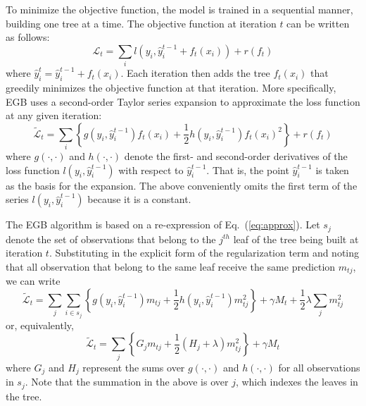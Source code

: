 \documentclass[english]{article}
\begin{document}
To minimize the objective function, the model is trained in a sequential manner, building one
tree at a time. 
The objective function at iteration $t$ can be written as follows:
\begin{equation}
\mathcal{L}_t = \sum_i l(y_i, \hat{y}_i^{t-1} + f_t(x_i)) + r(f_t)
\end{equation}
where $\hat{y}_i^t = \hat{y}_i^{t-1} + f_t(x_i)$.
Each iteration then adds the tree $f_t(x_i)$ that greedily minimizes the objective function at that
iteration.
More specifically, EGB uses a second-order Taylor series expansion to approximate the loss
function at any given iteration:
\begin{equation}
\tilde{\mathcal{L}}_t = \sum_i \left\{g(y_i, \hat{y}_i^{t-1}) f_t(x_i) 
+ \frac{1}{2}h(y_i, \hat{y}_i^{t-1}) f_t(x_i)^2 \right\} + r(f_t)
\label{eq:approx}
\end{equation}
where $g(\cdot, \cdot)$ and $h(\cdot, \cdot)$ denote the first- and second-order derivatives of the 
loss function $l(y_i, \hat{y}_i^{t-1})$ with respect to $\hat{y}_i^{t-1}$.
That is, the point $\hat{y}_i^{t-1}$ is taken as the basis for the expansion.
The above conveniently omits the first term of the series $l(y_i, \hat{y}_i^{t-1})$ because it is a constant.

The EGB algorithm is based on a re-expression of Eq.\ (\ref{eq:approx}).
Let $s_j$ denote the set of observations that belong to the $j^{th}$ leaf of the tree being built at 
iteration $t$.
Substituting in the explicit form of the regularization term and noting that all observation that belong to 
the same leaf receive the same prediction $m_{tj}$, we can write
\begin{equation}
\tilde{\mathcal{L}}_t = \sum_j \sum_{i \in s_j} \left\{g(y_i, \hat{y}_i^{t-1}) m_{tj}
+ \frac{1}{2}h(y_i, \hat{y}_i^{t-1}) m_{tj}^2 \right\} + \gamma M_t +  \frac{1}{2}\lambda \sum_j m_{tj}^2
\end{equation}
or, equivalently,
\begin{equation}
\tilde{\mathcal{L}}_t = \sum_j \left\{G_j m_{tj} + \frac{1}{2}(H_j + \lambda)m_{tj}^2  \right\} + \gamma M_t
\end{equation}
where $G_j$ and $H_j$ represent the sums over $g(\cdot, \cdot)$ and $h(\cdot, \cdot)$ for all observations
in $s_j$.
Note that the summation in the above is over $j$, which indexes the leaves in the tree.
\end{document}
